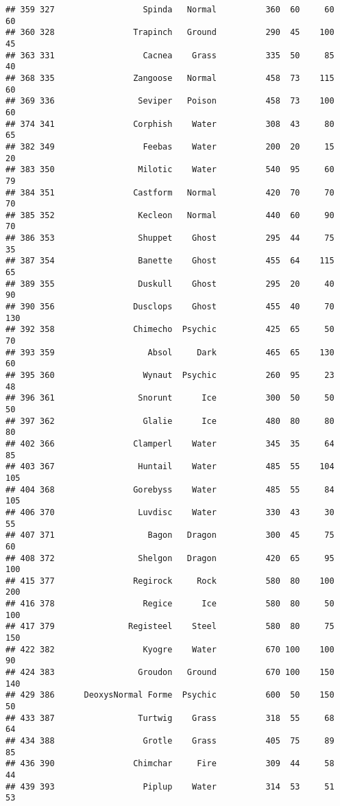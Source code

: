 \documentclass[
]{article}
\begin{document}
\begin{verbatim}
## 359 327                  Spinda   Normal          360  60     60      60
## 360 328                Trapinch   Ground          290  45    100      45
## 363 331                  Cacnea    Grass          335  50     85      40
## 368 335                Zangoose   Normal          458  73    115      60
## 369 336                 Seviper   Poison          458  73    100      60
## 374 341                Corphish    Water          308  43     80      65
## 382 349                  Feebas    Water          200  20     15      20
## 383 350                 Milotic    Water          540  95     60      79
## 384 351                Castform   Normal          420  70     70      70
## 385 352                 Kecleon   Normal          440  60     90      70
## 386 353                 Shuppet    Ghost          295  44     75      35
## 387 354                 Banette    Ghost          455  64    115      65
## 389 355                 Duskull    Ghost          295  20     40      90
## 390 356                Dusclops    Ghost          455  40     70     130
## 392 358                Chimecho  Psychic          425  65     50      70
## 393 359                   Absol     Dark          465  65    130      60
## 395 360                  Wynaut  Psychic          260  95     23      48
## 396 361                 Snorunt      Ice          300  50     50      50
## 397 362                  Glalie      Ice          480  80     80      80
## 402 366                Clamperl    Water          345  35     64      85
## 403 367                 Huntail    Water          485  55    104     105
## 404 368                Gorebyss    Water          485  55     84     105
## 406 370                 Luvdisc    Water          330  43     30      55
## 407 371                   Bagon   Dragon          300  45     75      60
## 408 372                 Shelgon   Dragon          420  65     95     100
## 415 377                Regirock     Rock          580  80    100     200
## 416 378                  Regice      Ice          580  80     50     100
## 417 379               Registeel    Steel          580  80     75     150
## 422 382                  Kyogre    Water          670 100    100      90
## 424 383                 Groudon   Ground          670 100    150     140
## 429 386      DeoxysNormal Forme  Psychic          600  50    150      50
## 433 387                 Turtwig    Grass          318  55     68      64
## 434 388                  Grotle    Grass          405  75     89      85
## 436 390                Chimchar     Fire          309  44     58      44
## 439 393                  Piplup    Water          314  53     51      53

\end{verbatim}
\end{document}
